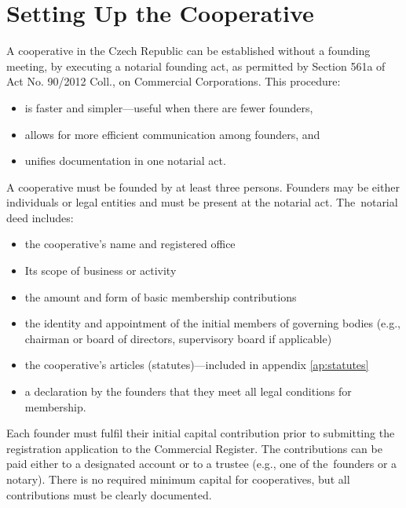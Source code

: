\section{Setting Up the Cooperative}\label{sec:coop-setup}
A cooperative in the Czech Republic can be established without a founding meeting, by executing a notarial founding act, as permitted by Section 561a of Act No. 90/2012 Coll., on Commercial Corporations\cite{ZOK}. This procedure:
\begin{itemize}
    \item is faster and simpler---useful when there are fewer founders,
    \item allows for more efficient communication among founders, and
    \item unifies documentation in one notarial act.
\end{itemize}
A cooperative must be founded by at least three persons. Founders may be either individuals or legal entities and must be present at the notarial act. The~notarial deed includes:
\begin{itemize}
    \item the cooperative’s name and registered office
    \item Its scope of business or activity
    \item the amount and form of basic membership contributions
    \item the identity and appointment of the initial members of governing bodies (e.g., chairman or board of directors, supervisory board if applicable)
    \item the cooperative's articles (statutes)---included in appendix \ref{ap:statutes} 
    \item a declaration by the founders that they meet all legal conditions for membership.\cite{coop-funding}
\end{itemize}
Each founder must fulfil their initial capital contribution prior to submitting the registration application to the Commercial Register. The contributions can be paid either to a designated account or to a trustee (e.g., one of the~founders or a notary). There is no required minimum capital for cooperatives, but all contributions must be clearly documented.
\cite{coop-funding}

